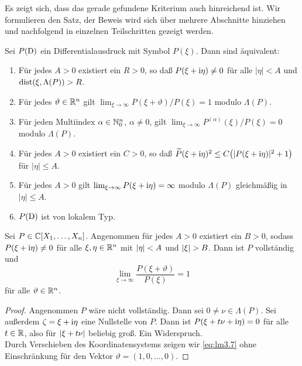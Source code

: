 Es zeigt sich, dass das gerade gefundene Kriterium auch hinreichend ist. Wir formulieren den Satz, der Beweis wird sich über mehrere Abschnitte hinziehen und nachfolgend in einzelnen Teilschritten gezeigt werden.
\begin{thm}
Sei $P(\mathrm D)$ ein Differentialausdruck mit Symbol $P(\xi)$. Dann sind \"aquivalent:
\begin{enumerate}
\item Für jedes $A>0$ existiert ein $R>0$, so daß $P(\xi+\mathrm i\eta)\ne0$ für alle $|\eta|<A$ und $\operatorname{dist}(\xi,\Lambda(P))>R$.
\item Für jedes $\vartheta\in\mathbb R^n$ gilt $\lim_{\xi\to\infty} P(\xi+\vartheta)/P(\xi)=1$ modulo $\Lambda(P)$.
\item Für jeden Multiindex $\alpha\in\mathbb N_0^n$, $\alpha\ne0$, gilt $\lim_{\xi\to\infty} P^{(\alpha)}(\xi)/P(\xi)=0$ modulo $\Lambda(P)$.
\item Für jedes $A>0$ existiert ein $C>0$, so daß $\widetilde P(\xi+\mathrm i\eta)^2\le C\big(|P(\xi+\mathrm i\eta)|^2+1\big)$ für $|\eta|\le A$.
\item Für jedes $A>0$ gilt $\lim_{\xi\to\infty} P(\xi+\mathrm i\eta)=\infty$ modulo $\Lambda(P)$ gleichmäßig in $|\eta|\le A$.
\item $P(\mathrm D)$ ist von lokalem Typ.
\end{enumerate}
\end{thm} 





\begin{lem}
Sei $P\in \mathbb C[X_1,\ldots,X_n]$. Angenommen für jedes $A>0$ existiert ein $B>0$, sodass $P(\xi+\mathrm i\eta)\neq 0$ für alle $\xi,\eta\in\mathbb R^n$ mit $\lvert\eta\rvert<A$ und $\lvert\xi\rvert>B$. Dann ist $P$ vollständig und
\begin{equation}
\lim_{\xi\to\infty}\dfrac{P(\xi+\vartheta)}{P(\xi)}=1 \label{eq:lm3.7}
\end{equation}
für alle $ \vartheta\in\mathbb R^n$.
\end{lem}
\begin{proof}
Angenommen $P$ wäre nicht vollständig. Dann sei $0\neq\nu\in\Lambda(P)$. Sei außerdem $\zeta=\xi+\mathrm i\eta$ eine Nullstelle von $P$. Dann ist $P(\xi+t\nu+\mathrm i\eta)=0$ für alle $t\in\mathbb R$, also für $\lvert\xi+t\nu\rvert$ beliebig groß. Ein Widerspruch.\\
Durch Verschieben des Koordinatensystems zeigen wir \ref{eq:lm3.7} ohne Einschränkung für den Vektor $\vartheta=(1,0,\ldots,0)$.
\end{proof}

